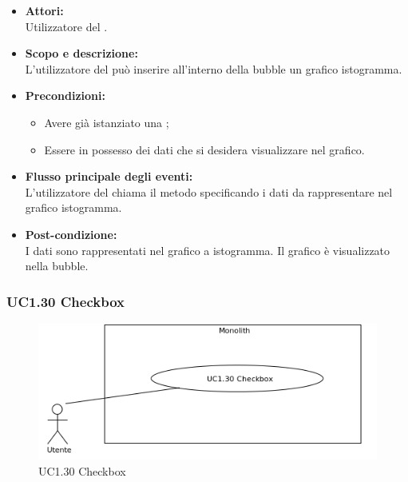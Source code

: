 \begin{itemize}
	\item \textbf{Attori:}
	\\Utilizzatore del .
	\item \textbf{Scopo e descrizione:} 
	\\L’utilizzatore del  può inserire all'interno della bubble un grafico istogramma.
	\item \textbf{Precondizioni:}
	\begin{itemize}
		\item Avere già istanziato una ;
		\item Essere in possesso dei dati che si desidera visualizzare nel grafico.
	\end{itemize}
	\item \textbf{Flusso principale degli eventi:}
	\\L’utilizzatore del  chiama il metodo specificando i dati da rappresentare nel grafico istogramma.
	\item \textbf{Post-condizione:}
	\\I dati sono rappresentati nel grafico a istogramma. Il grafico è visualizzato nella bubble.
\end{itemize}

\subsubsection{UC1.30 Checkbox} \label{UC1.30}

\begin{figure}[H]
	\centering
	\includegraphics[width=15cm]{../../documenti/AnalisiDeiRequisiti/Diagrammi_img/uc1_30.png}
	\caption{UC1.30 Checkbox}
\end{figure}

